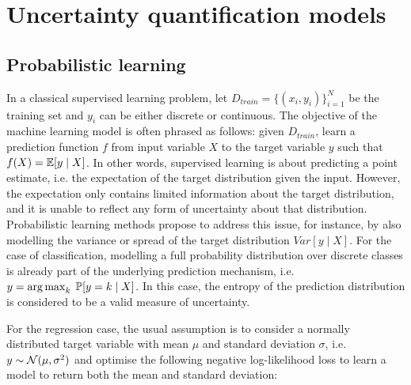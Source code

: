


\section{Uncertainty quantification models}

\subsection{Probabilistic learning} \label{model:probabilistic-learning}

In a classical supervised learning problem, let $D_{train} = \{(x_i, y_i)\}_{i=1}^N$ be the training set and $y_i$ can be either discrete or continuous. The objective of the machine learning model is often phrased as follows: given $D_{train}$, learn a prediction function $f$ from input variable $X$ to the target variable $y$ such that $f(X) = \operatorname{\mathbb{E}}[y \mid X]$. In other words, supervised learning is about predicting a point estimate, i.e. the expectation of the target distribution given the input. However, the expectation only contains limited information about the target distribution, and it is unable to reflect any form of uncertainty about that distribution. Probabilistic learning methods propose to address this issue, for instance, by also modelling the variance or spread of the target distribution $Var[y \mid X]$. For the case of classification, modelling a full probability distribution over discrete classes is already part of the underlying prediction mechanism, i.e.  $y = \operatorname*{\arg\max}_k \; \operatorname{\mathbb{P}}[y = k \mid X]$. In this case, the entropy of the prediction distribution is considered to be a valid measure of uncertainty.

For the regression case, the usual assumption is to consider a normally distributed target variable with mean $\mu$ and standard deviation $\sigma$, i.e. $y \sim \mathcal{N}(\mu, \sigma^2)$ and optimise the following negative log-likelihood loss to learn a model to return both the mean and standard deviation:

